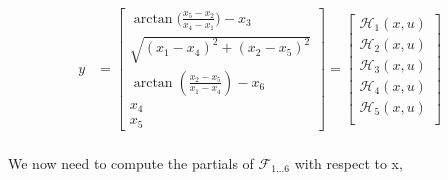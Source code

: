 \documentclass[paper=a4, fontsize=11pt]{scrartcl} %
\numberwithin{equation}{section} %
\numberwithin{figure}{section} %
\numberwithin{table}{section} %
\begin{document}
\begin{framed}
\begin{align*}
  y &= \begin{bmatrix} \arctan{(\frac{x_5 - x_2}{x_4 - x_1}}) - x_3   \\ 
                \sqrt{ (x_1 - x_4)^2 + (x_2 - x_5)^2}  \\
                \arctan{(\frac{x_2 - x_5}{x_1 - x_4})} - x_6 \\
                x_4 \\
                x_5
  \end{bmatrix} 
            = \begin{bmatrix}
           \mathcal{H}_1(x,u) \\
           \mathcal{H}_2(x,u) \\
           \mathcal{H}_3(x,u) \\
           \mathcal{H}_4(x,u) \\
           \mathcal{H}_5(x,u) \\
         \end{bmatrix}\\
\end{align*}

We now need to compute the partials of  $\mathcal{F}_{1\dots6}$ with respect to x,


\end{framed}
\end{document}
